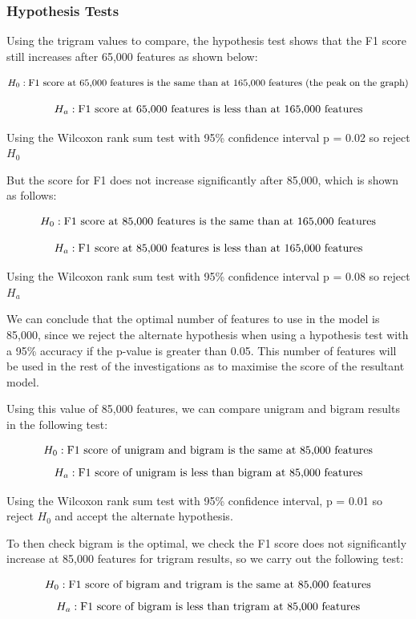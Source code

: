 \subsubsection{Hypothesis Tests}

Using the trigram values to compare, the hypothesis test shows that the F1 score still increases after 65,000 features as shown below:

$$ H_0:  \textnormal{F1 score at 65,000 features is the same than at 165,000 features (the peak on the graph)}$$

$$ H_a: \textnormal{F1 score at 65,000 features is less than at 165,000 features} $$


Using the Wilcoxon rank sum test with 95\% confidence interval p = 0.02 so reject $H_0$

But the score for F1 does not increase significantly after 85,000, which is shown as follows:

$$ H_0:  \textnormal{F1 score at 85,000 features is the same than at 165,000 features}$$

$$ H_a: \textnormal{F1 score at 85,000 features is less than at 165,000 features} $$

Using the Wilcoxon rank sum test with 95\% confidence interval p = 0.08 so reject $H_a$

We can conclude that the optimal number of features to use in the model is 85,000, since we reject the alternate hypothesis when using a hypothesis test with a 95\% accuracy if the p-value is greater than 0.05. This number of features will be used in the rest of the investigations as to maximise the score of the resultant model. 

Using this value of 85,000 features, we can compare unigram and bigram results in the following test:

$$ H_0: \textnormal{F1 score of unigram and bigram is the same at 85,000 features} $$
$$ H_a: \textnormal{F1 score of unigram is less than bigram at 85,000 features} $$

Using the Wilcoxon rank sum test with 95\% confidence interval, p = 0.01 so reject $H_0$ and accept the alternate hypothesis.

To then check bigram is the optimal, we check the F1 score does not significantly increase at 85,000 features for trigram results, so we carry out the following test:

$$ H_0: \textnormal{F1 score of bigram and trigram is the same at 85,000 features} $$
$$ H_a: \textnormal{F1 score of bigram is less than trigram at 85,000 features} $$

